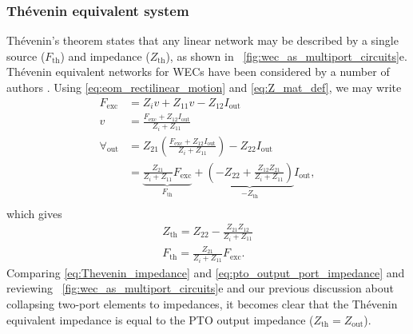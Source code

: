 \documentclass[twocolumn]{autart}
\begin{document}
\subsubsection{Th\'{e}venin equivalent system}\label{sec:thevenin_equivalent_system}
Th\'{e}venin's theorem \cite{Thevenin:1883aa} states that any linear network may be described by a single source ($F_{\textrm{th}}$) and impedance ($Z_{\textrm{th}}$), as shown in \figurename~\ref{fig:wec_as_multiport_circuits}e.
Th\'{e}venin equivalent networks for WECs have been considered by a number of authors \cite{McCabe:2024aa,Bacelli:2021aa,Blanco:2019aa,Bubbar:2018aa,Lewis:2013aa}.
Using \eqref{eq:eom_rectilinear_motion} and \eqref{eq:Z_mat_def}, we may write
%
\begin{equation}
        \nonumber
        \begin{split}
                F_{\textrm{exc}} &= Z_i v + Z_{11} v - Z_{12}I_{\textrm{out}} \\
                v &= \frac{F_{\textrm{exc}} + Z_{12}I_{\textrm{out}} }{Z_i + Z_{11}} \\[0.5em]
                \forall_{\textrm{out}}  &= Z_{21}\left(\frac{F_{\textrm{exc}} + Z_{12}I_{\textrm{out}} }{Z_i + Z_{11}}\right) - Z_{22}I_{\textrm{out}} \\
                &= \underbrace{\frac{Z_{21}}{Z_i + Z_{11}} F_\textrm{exc}}_{F_{\textrm{th}}} + \underbrace{\left( - Z_{22} + \frac{Z_{12}Z_{21}}{Z_i + Z_{11}}\right)}_{-Z_\textrm{th}} I_{\textrm{out}} , \\
        \end{split}
\end{equation}
%
which gives
%
\begin{subequations}
        \begin{gather}
                Z_{\textrm{th}} = Z_{22} - \frac{Z_{21} Z_{12}}{Z_{i} + Z_{11}} \label{eq:Thevenin_impedance} \\
                F_{\textrm{th}} = \frac{Z_{21}}{Z_i + Z_{11}}F_{\textrm{exc}} . \label{eq:Thevenin_force}
        \end{gather}
\end{subequations}
%
Comparing \eqref{eq:Thevenin_impedance} and \eqref{eq:pto_output_port_impedance} and reviewing \figurename~\ref{fig:wec_as_multiport_circuits}e and our previous discussion about collapsing two-port elements to impedances, it becomes clear that the Th\'{e}venin equivalent impedance is equal to the PTO output impedance ($Z_{\textrm{th}} = Z_{\textrm{out}}$).
\end{document}

